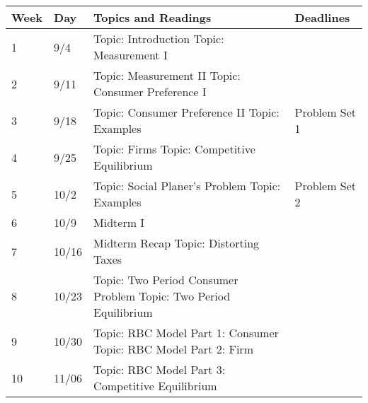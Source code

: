 \documentclass[12pt]{article}
\begin{document}
\newlength\bb
\setlength{}
\newlength\qq
\setlength{}
\newlength\rr
\setlength{}
\newlength\pp
\setlength{}
\begin{tabular}{|p{\bb}|p{\bb}|p{\pp}|p{\rr}|}
    \hline
        Week & Day & Topics and Readings & Deadlines \\
    \hline
    \hline
        1
        &
        9/4
        &
        Topic: Introduction
        \newline
        Topic: Measurement I
        &
    \\
    \hline
        2
        &
        9/11
        &
        Topic: Measurement II
        \newline
        Topic: Consumer Preference I
        &
    \\
    \hline
        3
        &
        9/18
        &
        Topic: Consumer Preference II
        \newline
        Topic: Examples
        &
        Problem Set 1
    \\
    \hline
        4
        &
        9/25
        &
        Topic: Firms
        \newline
        Topic: Competitive Equilibrium
        &
    \\
    \hline
        5
        &
        10/2
        &
        Topic: Social Planer's Problem
        \newline
        Topic: Examples
        &
        Problem Set 2
    \\
    \hline
        6
        &
        10/9
        &
        Midterm I
        &
    \\
    \hline
        7
        &
        10/16
        &
        Midterm Recap
        \newline
        Topic: Distorting Taxes
        &
    \\
    \hline
        8
        &
        10/23
        &
        Topic: Two Period Consumer Problem
        \newline
        Topic: Two Period Equilibrium
        &
    \\
    \hline
        9
        &
        10/30
        &
        Topic: RBC Model Part 1: Consumer
        \newline
        Topic: RBC Model Part 2: Firm
        &
    \\
    \hline
        10
        &
        11/06
        &
        Topic: RBC Model Part 3: Competitive Equilibrium

\end{tabular}
\end{document}
